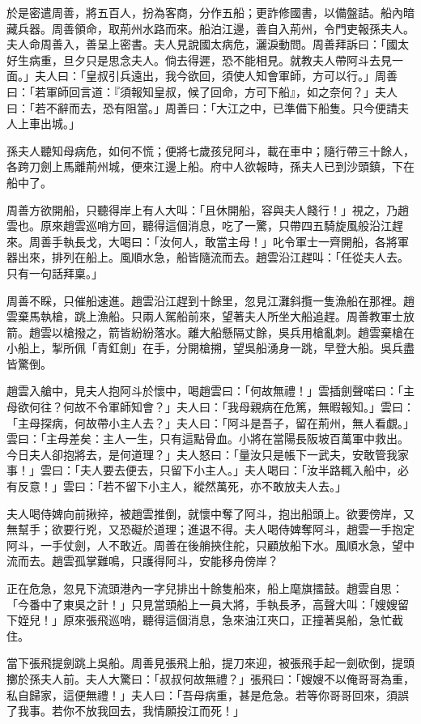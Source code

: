 於是密遣周善，將五百人，扮為客商，分作五船；更詐修國書，以備盤詰。船內暗藏兵器。周善領命，取荊州水路而來。船泊江邊，善自入荊州，令門吏報孫夫人。夫人命周善入，善呈上密書。夫人見說國太病危，灑淚動問。周善拜訴曰：「國太好生病重，旦夕只是思念夫人。倘去得遲，恐不能相見。就教夫人帶阿斗去見一面。」夫人曰：「皇叔引兵遠出，我今欲回，須使人知會軍師，方可以行。」周善曰：「若軍師回言道：『須報知皇叔，候了回命，方可下船』，如之奈何？」夫人曰：「若不辭而去，恐有阻當。」周善曰：「大江之中，已準備下船隻。只今便請夫人上車出城。」

孫夫人聽知母病危，如何不慌；便將七歲孩兒阿斗，載在車中；隨行帶三十餘人，各跨刀劍上馬離荊州城，便來江邊上船。府中人欲報時，孫夫人已到沙頭鎮，下在船中了。

周善方欲開船，只聽得岸上有人大叫：「且休開船，容與夫人餞行！」視之，乃趙雲也。原來趙雲巡哨方回，聽得這個消息，吃了一驚，只帶四五騎旋風般沿江趕來。周善手執長戈，大喝曰：「汝何人，敢當主母！」叱令軍士一齊開船，各將軍器出來，排列在船上。風順水急，船皆隨流而去。趙雲沿江趕叫：「任從夫人去。只有一句話拜稟。」

周善不睬，只催船速進。趙雲沿江趕到十餘里，忽見江灘斜攬一隻漁船在那裡。趙雲棄馬執槍，跳上漁船。只兩人駕船前來，望著夫人所坐大船追趕。周善教軍士放箭。趙雲以槍撥之，箭皆紛紛落水。離大船懸隔丈餘，吳兵用槍亂刺。趙雲棄槍在小船上，掣所佩「青釭劍」在手，分開槍搠，望吳船湧身一跳，早登大船。吳兵盡皆驚倒。

趙雲入艙中，見夫人抱阿斗於懷中，喝趙雲曰：「何故無禮！」雲插劍聲喏曰：「主母欲何往？何故不令軍師知會？」夫人曰：「我母親病在危篤，無暇報知。」雲曰：「主母探病，何故帶小主人去？」夫人曰：「阿斗是吾子，留在荊州，無人看覷。」雲曰：「主母差矣：主人一生，只有這點骨血。小將在當陽長阪坡百萬軍中救出。今日夫人卻抱將去，是何道理？」夫人怒曰：「量汝只是帳下一武夫，安敢管我家事！」雲曰：「夫人要去便去，只留下小主人。」夫人喝曰：「汝半路輒入船中，必有反意！」雲曰：「若不留下小主人，縱然萬死，亦不敢放夫人去。」

夫人喝侍婢向前揪捽，被趙雲推倒，就懷中奪了阿斗，抱出船頭上。欲要傍岸，又無幫手；欲要行兇，又恐礙於道理；進退不得。夫人喝侍婢奪阿斗，趙雲一手抱定阿斗，一手仗劍，人不敢近。周善在後艄挾住舵，只顧放船下水。風順水急，望中流而去。趙雲孤掌難鳴，只護得阿斗，安能移舟傍岸？

正在危急，忽見下流頭港內一字兒排出十餘隻船來，船上麾旗擂鼓。趙雲自思：「今番中了東吳之計！」只見當頭船上一員大將，手執長矛，高聲大叫：「嫂嫂留下姪兒！」原來張飛巡哨，聽得這個消息，急來油江夾口，正撞著吳船，急忙截住。

當下張飛提劍跳上吳船。周善見張飛上船，提刀來迎，被張飛手起一劍砍倒，提頭擲於孫夫人前。夫人大驚曰：「叔叔何故無禮？」張飛曰：「嫂嫂不以俺哥哥為重，私自歸家，這便無禮！」夫人曰：「吾母病重，甚是危急。若等你哥哥回來，須誤了我事。若你不放我回去，我情願投江而死！」

